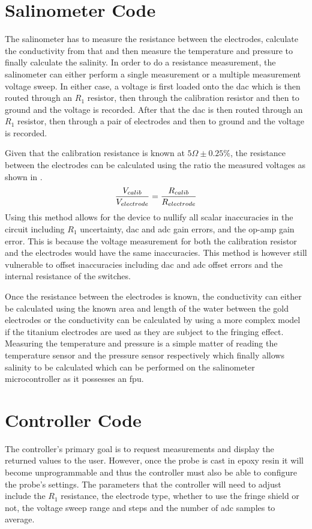\section{Salinometer Code}

The salinometer has to measure the resistance between the electrodes, calculate the conductivity from that and then measure the temperature and pressure to finally calculate the salinity.
In order to do a resistance measurement, the salinometer can either perform a single measurement or a multiple measurement voltage sweep.
In either case, a voltage is first loaded onto the \gls{dac} which is then routed through an $R_1$ resistor, then through the calibration resistor and then to ground and the voltage is recorded.
After that the \gls{dac} is then routed through an $R_1$ resistor, then through a pair of electrodes and then to ground and the voltage is recorded.

Given that the calibration resistance is known at $5\Omega\pm0.25\%$, the resistance between the electrodes can be calculated using the ratio the measured voltages as shown in .
\begin{equation}
    \frac{\displaystyle V_{calib}}{\displaystyle V_{electrode}} = \frac{\displaystyle R_{calib}}{\displaystyle R_{electrode}}
    \label{eqn:electrode-calib-resistance}
\end{equation}
Using this method allows for the device to nullify all scalar inaccuracies in the circuit including $R_1$ uncertainty, \gls{dac} and \gls{adc} gain errors, and the op-amp gain error.
This is because the voltage measurement for both the calibration resistor and the electrodes would have the same inaccuracies. 
This method is however still vulnerable to offset inaccuracies including \gls{dac} and \gls{adc} offset errors and the internal resistance of the switches.

Once the resistance between the electrodes is known, the conductivity can either be calculated using the known area and length of the water between the gold electrodes or the conductivity can be calculated by using a more complex model if the titanium electrodes are used as they are subject to the fringing effect.
Measuring the temperature and pressure is a simple matter of reading the temperature sensor and the pressure sensor respectively which finally allows salinity to be calculated which can be performed on the salinometer microcontroller as it possesses an \gls{fpu}.

\section{Controller Code}

The controller's primary goal is to request measurements and display the returned values to the user.
However, once the probe is cast in epoxy resin it will become unprogrammable and thus the controller must also be able to configure the probe's settings.
The parameters that the controller will need to adjust include the $R_1$ resistance, the electrode type, whether to use the fringe shield or not, the voltage sweep range and steps and the number of \gls{adc} samples to average.